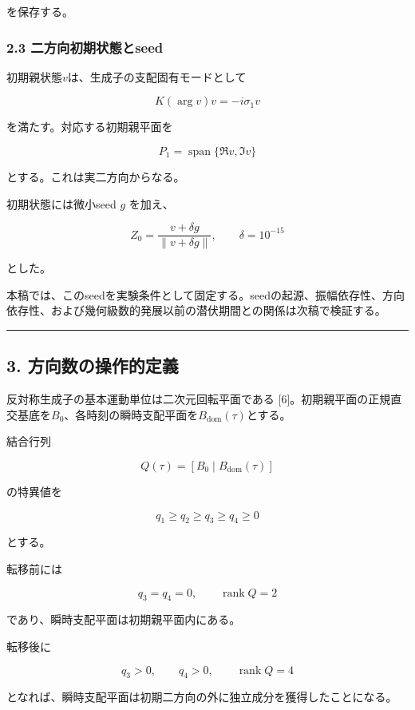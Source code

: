 \documentclass[
  a4paper,
]{ltjsarticle}
\begin{document}
を保存する。

\subsubsection{2.3
二方向初期状態とseed}\label{ux4e8cux65b9ux5411ux521dux671fux72b6ux614bux3068seed}

初期親状態\(v\)は、生成子の支配固有モードとして

\[
K(\arg v)v=-i\sigma_1v
\]

を満たす。対応する初期親平面を

\[
P_1=\operatorname{span}\{\Re v,\Im v\}
\]

とする。これは実二方向からなる。

初期状態には微小seed \(g\) を加え、

\[
Z_0=\frac{v+\delta g}{\|v+\delta g\|},
\qquad
\delta=10^{-15}
\]

とした。

本稿では、このseedを実験条件として固定する。seedの起源、振幅依存性、方向依存性、および幾何級数的発展以前の潜伏期間との関係は次稿で検証する。

\begin{center}\rule{0.5\linewidth}{0.5pt}\end{center}

\subsection{3.
方向数の操作的定義}\label{ux65b9ux5411ux6570ux306eux64cdux4f5cux7684ux5b9aux7fa9}

反対称生成子の基本運動単位は二次元回転平面である
{[}6{]}。初期親平面の正規直交基底を\(B_0\)、各時刻の瞬時支配平面を\(B_{\mathrm{dom}}(\tau)\)とする。

結合行列

\[
Q(\tau)=[B_0\mid B_{\mathrm{dom}}(\tau)]
\]

の特異値を

\[
q_1\ge q_2\ge q_3\ge q_4\ge0
\]

とする。

転移前には

\[
q_3=q_4=0,
\qquad
\operatorname{rank}Q=2
\]

であり、瞬時支配平面は初期親平面内にある。

転移後に

\[
q_3>0,
\qquad
q_4>0,
\qquad
\operatorname{rank}Q=4
\]

となれば、瞬時支配平面は初期二方向の外に独立成分を獲得したことになる。
\end{document}

